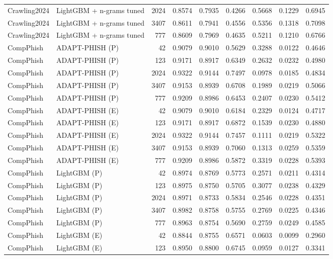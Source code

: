 \begin{table}[t]
\begin{tabular}{llrrrrrrr}
Crawling2024 & LightGBM + n-grams tuned & 2024 & 0.8574 & 0.7935 & 0.4266 & 0.5668 & 0.1229 & 0.6945 \\
Crawling2024 & LightGBM + n-grams tuned & 3407 & 0.8611 & 0.7941 & 0.4556 & 0.5356 & 0.1318 & 0.7098 \\
Crawling2024 & LightGBM + n-grams tuned & 777 & 0.8609 & 0.7969 & 0.4635 & 0.5211 & 0.1210 & 0.6766 \\
CompPhish & ADAPT-PHISH (P) & 42 & 0.9079 & 0.9010 & 0.5629 & 0.3288 & 0.0122 & 0.4646 \\
CompPhish & ADAPT-PHISH (P) & 123 & 0.9171 & 0.8917 & 0.6349 & 0.2632 & 0.0232 & 0.4980 \\
CompPhish & ADAPT-PHISH (P) & 2024 & 0.9322 & 0.9144 & 0.7497 & 0.0978 & 0.0185 & 0.4834 \\
CompPhish & ADAPT-PHISH (P) & 3407 & 0.9153 & 0.8939 & 0.6708 & 0.1989 & 0.0219 & 0.5066 \\
CompPhish & ADAPT-PHISH (P) & 777 & 0.9209 & 0.8986 & 0.6453 & 0.2407 & 0.0230 & 0.5412 \\
CompPhish & ADAPT-PHISH (E) & 42 & 0.9079 & 0.9010 & 0.6184 & 0.2329 & 0.0124 & 0.4717 \\
CompPhish & ADAPT-PHISH (E) & 123 & 0.9171 & 0.8917 & 0.6872 & 0.1539 & 0.0230 & 0.4880 \\
CompPhish & ADAPT-PHISH (E) & 2024 & 0.9322 & 0.9144 & 0.7457 & 0.1111 & 0.0219 & 0.5322 \\
CompPhish & ADAPT-PHISH (E) & 3407 & 0.9153 & 0.8939 & 0.7060 & 0.1313 & 0.0259 & 0.5359 \\
CompPhish & ADAPT-PHISH (E) & 777 & 0.9209 & 0.8986 & 0.5872 & 0.3319 & 0.0228 & 0.5393 \\
CompPhish & LightGBM (P) & 42 & 0.8974 & 0.8769 & 0.5773 & 0.2571 & 0.0211 & 0.4314 \\
CompPhish & LightGBM (P) & 123 & 0.8975 & 0.8750 & 0.5705 & 0.3077 & 0.0238 & 0.4329 \\
CompPhish & LightGBM (P) & 2024 & 0.8971 & 0.8733 & 0.5834 & 0.2546 & 0.0228 & 0.4351 \\
CompPhish & LightGBM (P) & 3407 & 0.8982 & 0.8758 & 0.5755 & 0.2769 & 0.0225 & 0.4346 \\
CompPhish & LightGBM (P) & 777 & 0.8963 & 0.8754 & 0.5690 & 0.2759 & 0.0249 & 0.4585 \\
CompPhish & LightGBM (E) & 42 & 0.8844 & 0.8755 & 0.6571 & 0.0603 & 0.0099 & 0.2960 \\
CompPhish & LightGBM (E) & 123 & 0.8950 & 0.8800 & 0.6745 & 0.0959 & 0.0127 & 0.3341 \\

\end{tabular}
\end{table}
